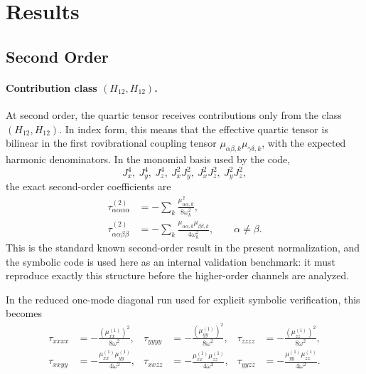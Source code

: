 \documentclass[11pt,a4paper]{article}
\begin{document}
\section{Results}
\subsection{Second Order}
\paragraph{Contribution class \((H_{12},H_{12})\).}
At second order, the quartic tensor receives contributions only from the class
\((H_{12},H_{12})\). In index form, this means that the effective quartic tensor is bilinear
in the first rovibrational coupling tensor \(\mu_{\alpha\beta,k}\mu_{\gamma\delta,k}\), with
the expected harmonic denominators. In the monomial basis used by the code,
\[
J_x^4,\ J_y^4,\ J_z^4,\ J_x^2J_y^2,\ J_x^2J_z^2,\ J_y^2J_z^2,
\]
the exact second-order coefficients are
\begin{align}
\tau_{\alpha\alpha\alpha\alpha}^{(2)} &=
-\sum_k \frac{\mu_{\alpha\alpha,k}^2}{8\omega_k^2},\\
\tau_{\alpha\alpha\beta\beta}^{(2)} &=
-\sum_k \frac{\mu_{\alpha\alpha,k}\mu_{\beta\beta,k}}{4\omega_k^2},
\qquad \alpha \neq \beta.
\end{align}
This is the standard known second-order result in the present normalization, and the symbolic
code is used here as an internal validation benchmark: it must reproduce exactly this structure
before the higher-order channels are analyzed.

In the reduced one-mode diagonal run used for explicit symbolic verification, this becomes
\begin{align}
\tau_{xxxx} &= -\frac{\left(\mu_{xx}^{(1)}\right)^2}{8\omega^2}, &
\tau_{yyyy} &= -\frac{\left(\mu_{yy}^{(1)}\right)^2}{8\omega^2}, &
\tau_{zzzz} &= -\frac{\left(\mu_{zz}^{(1)}\right)^2}{8\omega^2},\\
\tau_{xxyy} &= -\frac{\mu_{xx}^{(1)}\mu_{yy}^{(1)}}{4\omega^2}, &
\tau_{xxzz} &= -\frac{\mu_{xx}^{(1)}\mu_{zz}^{(1)}}{4\omega^2}, &
\tau_{yyzz} &= -\frac{\mu_{yy}^{(1)}\mu_{zz}^{(1)}}{4\omega^2}.
\end{align}
\end{document}
